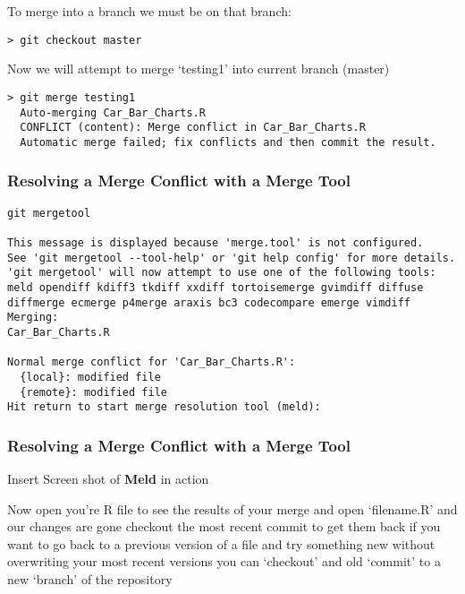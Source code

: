 \documentclass[xcolor=dvipsnames]{beamer}
\begin{document}
\begin{frame}[fragile]
To merge into a branch we must be on that branch:\\
\begin{block}{}
\begin{lstlisting}
> git checkout master
\end{lstlisting}
\end{block}

Now we will attempt to merge `testing1' into current branch (master)
\begin{block}{}
\begin{lstlisting}
> git merge testing1
  Auto-merging Car_Bar_Charts.R
  CONFLICT (content): Merge conflict in Car_Bar_Charts.R
  Automatic merge failed; fix conflicts and then commit the result.
\end{lstlisting}
\end{block}
\end{frame}


\begin{frame}[fragile]
\frametitle{Resolving a Merge Conflict with a Merge Tool}
\begin{lstlisting}
git mergetool

This message is displayed because 'merge.tool' is not configured.
See 'git mergetool --tool-help' or 'git help config' for more details.
'git mergetool' will now attempt to use one of the following tools:
meld opendiff kdiff3 tkdiff xxdiff tortoisemerge gvimdiff diffuse diffmerge ecmerge p4merge araxis bc3 codecompare emerge vimdiff
Merging:
Car_Bar_Charts.R

Normal merge conflict for 'Car_Bar_Charts.R':
  {local}: modified file
  {remote}: modified file
Hit return to start merge resolution tool (meld): 
\end{lstlisting}
\end{frame}

\begin{frame}[fragile]
\frametitle{Resolving a Merge Conflict with a Merge Tool}

Insert Screen shot of \textbf{Meld} in action

\end{frame}

\begin{frame}

Now open you're R file to see the results of your merge
\newline
\newline
and open `filename.R' and our changes are gone
\newline
\newline
checkout the most recent commit to get them back
\newline
\newline
if you want to go back to a previous version of a file and try something new without overwriting your most recent versions you can `checkout' and old `commit' to a new `branch' of the repository

\end{frame}
\end{document}
